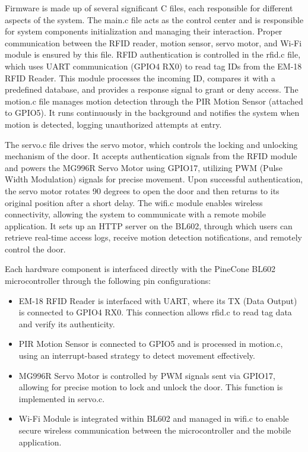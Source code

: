 \documentclass[a4paper]{scrartcl}
\begin{document}
Firmware is made up of several significant C files, each responsible for different aspects of the system. The main.c file acts as the control center and is responsible for system components initialization and managing their interaction. Proper communication between the RFID reader, motion sensor, servo motor, and Wi-Fi module is ensured by this file. RFID authentication is controlled in the rfid.c file, which uses UART communication (GPIO4 RX0) to read tag IDs from the EM-18 RFID Reader. This module processes the incoming ID, compares it with a predefined database, and provides a response signal to grant or deny access. The motion.c file manages motion detection through the PIR Motion Sensor (attached to GPIO5). It runs continuously in the background and notifies the system when motion is detected, logging unauthorized attempts at entry.

The servo.c file drives the servo motor, which controls the locking and unlocking mechanism of the door. It accepts authentication signals from the RFID module and powers the MG996R Servo Motor using GPIO17, utilizing PWM \cite{PWMGeeksforGeeks} (Pulse Width Modulation) signals for precise movement. Upon successful authentication, the servo motor rotates 90 degrees to open the door and then returns to its original position after a short delay. The wifi.c module enables wireless connectivity, allowing the system to communicate with a remote mobile application. It sets up an HTTP server on the BL602, through which users can retrieve real-time access logs, receive motion detection notifications, and remotely control the door.

Each hardware component is interfaced directly with the PineCone BL602 microcontroller through the following pin configurations:

\begin{itemize}
    \item EM-18 RFID Reader is interfaced with UART, where its TX (Data Output) is connected to GPIO4 RX0. This connection allows rfid.c to read tag data and verify its authenticity.
    \item PIR Motion Sensor is connected to GPIO5 and is processed in motion.c, using an interrupt-based strategy to detect movement effectively.
    \item MG996R Servo Motor is controlled by PWM signals sent via GPIO17, allowing for precise motion to lock and unlock the door. This function is implemented in servo.c.
    \item Wi-Fi Module is integrated within BL602 and managed in wifi.c to enable secure wireless communication between the microcontroller and the mobile application.
\end{itemize}
\end{document}

